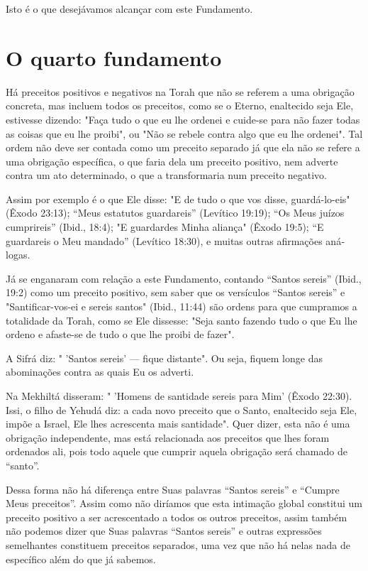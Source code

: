 Isto é o que desejávamos alcançar com este Fundamento.

\chapter*{O quarto fundamento
}

Há preceitos positivos e negativos na Torah que não se referem a uma
obrigação concreta, mas incluem todos os preceitos, como se o Eterno,
enaltecido seja Ele, estivesse dizendo: "Faça tudo o que eu lhe ordenei
e cuide-se para não fazer todas as coisas que eu lhe proibi", ou "Não se
rebele contra algo que eu lhe ordenei". Tal ordem não deve ser contada
como um preceito separado já que ela não se refere a uma obrigação
específica, o que faria dela um preceito positivo, nem adverte contra um
ato determinado, o que a trans­formaria num preceito negativo.

Assim por exemplo é o que Ele disse: "E de tudo o que vos disse,
guardá-lo-eis" (Êxodo 23:13); ``Meus estatutos guardareis'' (Levítico
19:19); ``Os Meus juízos cumprireis'' (Ibid., 18:4); "E guardardes Minha
aliança" (Êxodo 19:5); ``E guardareis o Meu mandado'' (Levítico 18:30), e
muitas outras afirmações aná­logas.

Já se enganaram com relação a este Fundamento, contando ``Santos sereis''
(Ibid., 19:2) como um preceito positivo, sem saber que os versículos
``Santos sereis'' e "Santificar-vos-ei e sereis santos" (Ibid., 11:44) são
ordens para que cumpramos a totalidade da Torah, como se Ele dissesse:
"Seja santo fazendo tudo o que Eu lhe ordeno e afaste-se de tudo o que
lhe proibi de fazer".

A Sifrá diz: " 'Santos sereis' --- fique distante". Ou seja, fiquem
lon­ge das abominações contra as quais Eu os adverti.

Na Mekhiltá disseram: " 'Homens de santidade sereis para Mim' (Êxo­do
22:30). Issi, o filho de Yehudá diz: a cada novo preceito que o Santo,
enalte­cido seja Ele, impõe a Israel, Ele lhes acrescenta mais
santidade". Quer dizer, esta não é uma obrigação independente, mas está
relacionada aos preceitos que lhes foram ordenados ali, pois todo aquele
que cumprir aquela obrigação será chamado de ``santo''.

Dessa forma não há diferença entre Suas palavras ``Santos sereis'' e
``Cumpre Meus preceitos''. Assim como não diríamos que esta intimação
glo­bal constitui um preceito positivo a ser acrescentado a todos os
outros precei­tos, assim também não podemos dizer que Suas palavras
``Santos sereis'' e ou­tras expressões semelhantes constituem preceitos
separados, uma vez que não há nelas nada de específico além do que já
sabemos.

